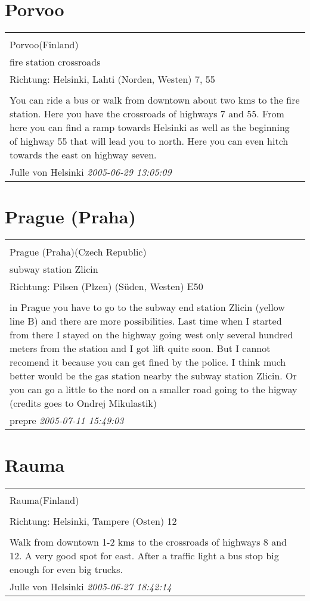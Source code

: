 \documentclass[a4paper,12pt]{article}
\begin{document}
\section{Porvoo}
\begin{tabular}{|p{13cm}|}
\hline\\
Porvoo(Finland)\\
fire station crossroads\\
Richtung: Helsinki, Lahti (Norden, Westen) 7, 55 \\
\hline\\
You can ride a bus or walk from downtown about two kms to the fire station. Here you have the crossroads of highways 7 and 55. From here you can find a ramp towards Helsinki as well as the beginning of highway 55 that will lead you to north. Here you can even hitch towards the east on highway seven. \\
Julle von Helsinki \textit{ 2005-06-29 13:05:09 }\\\hline
\end{tabular}


\section{Prague (Praha)}
\begin{tabular}{|p{13cm}|}
\hline\\
Prague (Praha)(Czech Republic)\\
subway station Zlicin\\
Richtung: Pilsen (Plzen) (Süden, Westen) E50 \\
\hline\\
in Prague you have to go to the subway end station Zlicin (yellow line B) and there are more possibilities. Last time when I started from there I stayed on the highway going west only several hundred meters from the station and I got lift quite soon. But I cannot recomend it because you can get fined by the police. I think much better would be the gas station nearby the subway station Zlicin. Or you can go a little to the nord on a smaller road going to the higway (credits goes to Ondrej Mikulastik) \\
prepre \textit{ 2005-07-11 15:49:03 }\\\hline
\end{tabular}


\section{Rauma}
\begin{tabular}{|p{13cm}|}
\hline\\
Rauma(Finland)\\
\\
Richtung: Helsinki, Tampere (Osten) 12 \\
\hline\\
Walk from downtown 1-2 kms to the crossroads of highways 8 and 12. A very good spot for east. After a traffic light a bus stop big enough for even big trucks. \\
Julle von Helsinki \textit{ 2005-06-27 18:42:14 }\\\hline
\end{tabular}
\end{document}
